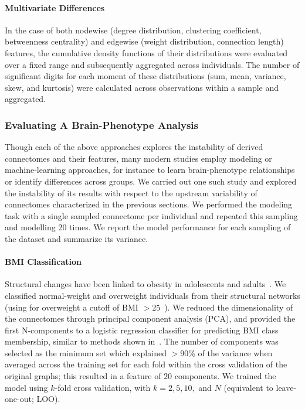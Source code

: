 \documentclass[fleqn,10pt]{SelfArx} %
\begin{document}
\paragraph{Multivariate Differences} In the case of both nodewise (degree distribution, clustering coefficient,
betweenness centrality) and edgewise (weight distribution, connection length) features, the cumulative density
functions of their distributions were evaluated over a fixed range and subsequently aggregated across individuals. The
number of significant digits for each moment of these distributions (sum, mean, variance, skew, and kurtosis) were
calculated across observations within a sample and aggregated.

\subsubsection*{Evaluating A Brain-Phenotype Analysis}
Though each of the above approaches explores the instability of derived connectomes and their features, many modern
studies employ modeling or machine-learning approaches, for instance to learn brain-phenotype relationships or identify
differences across groups. We carried out one such study and explored the instability of its results with respect to
the upstream variability of connectomes characterized in the previous sections. We performed the modeling task with a
single sampled connectome per individual and repeated this sampling and modelling 20 times. We report the model
performance for each sampling of the dataset and summarize its variance.

\paragraph{BMI Classification} Structural changes have been linked to obesity in adolescents and
adults~\cite{Raji2010-lh}. We classified normal-weight and overweight individuals from their structural networks (using
for overweight a cutoff of BMI $> 25$~\cite{Gupta2015-ap}). We reduced the dimensionality of the connectomes through
principal component analysis (PCA), and provided the first N-components to a logistic regression classifier for
predicting BMI class membership, similar to methods shown in~\cite{Gupta2015-ap,Park2015-uj}. The number of components
was selected as the minimum set which explained $> 90\%$ of the variance when averaged across the training set for each
fold within the cross validation of the original graphs; this resulted in a feature of $20$ components. We trained the
model using $k$-fold cross validation, with $k = 2, 5, 10,$ and $N$ (equivalent to leave-one-out; LOO).
\end{document}
